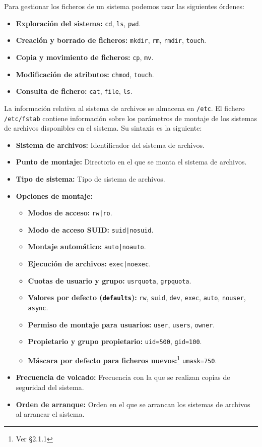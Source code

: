 Para gestionar los ficheros de un sistema podemos usar las siguientes órdenes:

\begin{itemize}
	\item\textbf{Exploración del sistema:} \texttt{cd}, \texttt{ls}, \texttt{pwd}.
	\item\textbf{Creación y borrado de ficheros:} \texttt{mkdir}, \texttt{rm}, \texttt{rmdir}, \texttt{touch}.
	\item\textbf{Copia y movimiento de ficheros:} \texttt{cp}, \texttt{mv}.
	\item\textbf{Modificación de atributos:} \texttt{chmod}, \texttt{touch}.
	\item\textbf{Consulta de fichero:} \texttt{cat}, \texttt{file}, \texttt{ls}.
\end{itemize}

La información relativa al sistema de archivos se almacena en \texttt{/etc}.
El fichero \texttt{/etc/fstab} contiene información sobre los parámetros de montaje de los sistemas de archivos disponibles en el sistema.
Su sintaxis es la siguiente:

\begin{itemize}
\item\textbf{Sistema de archivos:} Identificador del sistema de archivos.
\item\textbf{Punto de montaje:} Directorio en el que se monta el sistema de archivos.
\item\textbf{Tipo de sistema:} Tipo de sistema de archivos.
\item\textbf{Opciones de montaje:}
\begin{itemize}
	\item\textbf{Modos de acceso:} \texttt{rw|ro}.
	\item\textbf{Modo de acceso SUID:} \texttt{suid|nosuid}.
	\item\textbf{Montaje automático:} \texttt{auto|noauto}.
	\item\textbf{Ejecución de archivos:} \texttt{exec|noexec}.
	\item\textbf{Cuotas de usuario y grupo:} \texttt{usrquota}, \texttt{grpquota}.
	\item\textbf{Valores por defecto (\texttt{defaults}):} \texttt{rw}, \texttt{suid}, \texttt{dev}, \texttt{exec}, \texttt{auto}, \texttt{nouser}, \texttt{async}.
	\item\textbf{Permiso de montaje para usuarios:} \texttt{user}, \texttt{users}, \texttt{owner}.
	\item\textbf{Propietario y grupo propietario:} \texttt{uid=500}, \texttt{gid=100}.
	\item\textbf{Máscara por defecto para ficheros nuevos:}\footnote{Ver \S2.1.1} \texttt{umask=750}.
\end{itemize}
\item\textbf{Frecuencia de volcado:} Frecuencia con la que se realizan copias de seguridad del sistema.
\item\textbf{Orden de arranque:} Orden en el que se arrancan los sistemas de archivos al arrancar el sistema.
\end{itemize}

